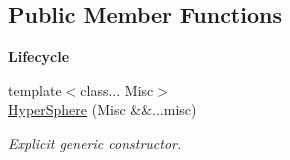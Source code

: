 \subsection*{Public Member Functions}
\begin{Indent}{\bf Lifecycle}\par
\begin{DoxyCompactItemize}
\item 
{\footnotesize template$<$class... Misc$>$ }\\\hyperlink{exceptionmagrathea_1_1HyperSphere_abf1820d27cf49f015d0fa64da8fbe778}{Hyper\-Sphere} (Misc \&\&...misc)
\begin{DoxyCompactList}\small\item\em Explicit generic constructor. \end{DoxyCompactList}\end{DoxyCompactItemize}
\end{Indent}
